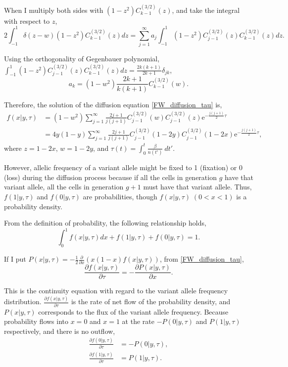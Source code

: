 \documentclass[12pt]{article}
\newcommand{\napier}{\mathrm{e}}
\newcommand{\henbibun}[2]{\frac{\partial {#1}}{\partial {#2}}}
\begin{document}
When I multiply both sides with $(1-z^2) C^{(3/2)}_{k-1} (z)$, and take the integral with respect to $z$,
\begin{equation}
 2\int_{-1}^{1}\delta(z-w) (1-z^2) C^{(3/2)}_{k-1} (z) dz= \sum_{j=1}^{\infty} a_j \int_{-1}^{1} (1-z^2) C^{(3/2)}_{j-1} (z) C^{(3/2)}_{k-1} (z) dz.
\end{equation}

Using the orthogonality of Gegenbauer polynomial, $\int_{-1}^{1} (1-z^2) C^{(3/2)}_{j-1} (z) C^{(3/2)}_{k-1} (z) dz = \frac{2k(k+1)}{2k+1} \delta_{jk}$,
\begin{equation}
 a_k = (1-w^2) \frac{2k+1}{k(k+1)} C^{(3/2)}_{k-1} (w).
\end{equation}

Therefore, the solution of the diffusion equation \eqref{FW_diffusion_tau} is,
\begin{align}
 f(x|y,\tau) & = (1-w^2) \sum_{j=1}^{\infty} \frac{2j+1}{j(j+1)} C^{(3/2)}_{j-1} (w) C^{(3/2)}_{j-1} (z) \napier^{-\frac{j(j+1)}{2}\tau}\\
 & = 4y(1-y) \sum_{j=1}^{\infty} \frac{2j+1}{j(j+1)} C^{(3/2)}_{j-1} (1-2y) C^{(3/2)}_{j-1} (1-2x) \napier^{-\frac{j(j+1)}{2}\tau},
\end{align}
where $z=1-2x$, $w=1-2y$, and $\tau(t) = \int_{0}^{t} \frac{\beta}{n(t')} \: dt'$.

However, allelic frequency of a variant allele might be fixed to 1 (fixation) or 0 (loss) during the diffusion process because if all the cells in generation $g$ have that variant allele, all the cells in generation $g+1$ must have that variant allele. Thus, $f(1|y,\tau)$ and $f(0|y,\tau)$ are probabilities, though $f(x|y,\tau) \; (0<x<1)$ is a probability density.

From the definition of probability, the following relationship holds,
\begin{equation}
 \int_{0}^{1} f(x|y,\tau) dx + f(1|y,\tau) + f(0|y,\tau) = 1.
\end{equation}

If I put $P(x|y,\tau) = - \frac{1}{2} \henbibun{}{x}\left( x(1-x)f(x|y,\tau) \right)$, from \eqref{FW_diffusion_tau},
\begin{equation}
 \henbibun{f(x|y,\tau)}{\tau} = - \henbibun{P(x|y, \tau)}{x}.
\end{equation}

This is the continuity equation with regard to the variant allele frequency distribution.
$\henbibun{f(x|y,\tau)}{\tau}$ is the rate of net flow of the probability density, and $P(x|y,\tau)$ corresponds to the flux of the variant allele frequency.
Because probability flows into $x=0$ and $x=1$ at the rate $-P(0|y,\tau)$ and $P(1|y,\tau)$ respectively, and there is no outflow,
\begin{align}
 \henbibun{f(0|y,\tau)}{\tau} & = -P(0|y, \tau),\label{fixation_flow}\\
 \henbibun{f(1|y,\tau)}{\tau} & = P(1|y, \tau).\label{loss_flow}
\end{align}
\end{document}
